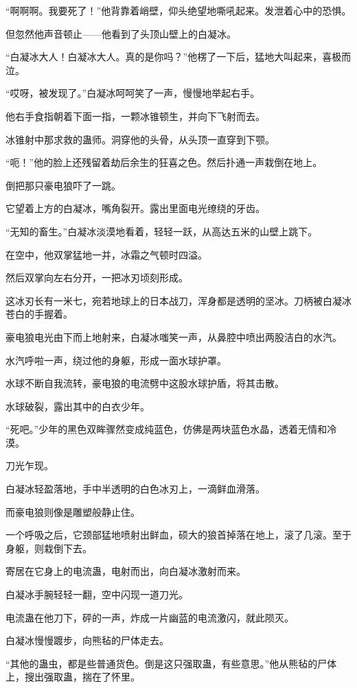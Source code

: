 \begin{this_body}
“啊啊啊。我要死了！”他背靠着峭壁，仰头绝望地嘶吼起来。发泄着心中的恐惧。

但忽然他声音顿止——他看到了头顶山壁上的白凝冰。

“白凝冰大人！白凝冰大人。真的是你吗？”他楞了一下后，猛地大叫起来，喜极而泣。

“哎呀，被发现了。”白凝冰呵呵笑了一声，慢慢地举起右手。

他右手食指朝着下面一指，一颗冰锥顿生，并向下飞射而去。

冰锥射中那求救的蛊师。洞穿他的头骨，从头顶一直穿到下颚。

“呃！”他的脸上还残留着劫后余生的狂喜之色。然后扑通一声栽倒在地上。

倒把那只豪电狼吓了一跳。

它望着上方的白凝冰，嘴角裂开。露出里面电光缭绕的牙齿。

“无知的畜生。”白凝冰淡漠地看着，轻轻一跃，从高达五米的山壁上跳下。

在空中，他双掌猛地一并，冰霜之气顿时四溢。

然后双掌向左右分开，一把冰刃顷刻形成。

这冰刃长有一米七，宛若地球上的日本战刀，浑身都是透明的坚冰。刀柄被白凝冰苍白的手握着。

豪电狼电光由下而上地射来，白凝冰嗤笑一声，从鼻腔中喷出两股洁白的水汽。

水汽呼啦一声，绕过他的身躯，形成一面水球护罩。

水球不断自我流转，豪电狼的电流劈中这股水球护盾，将其击散。

水球破裂，露出其中的白衣少年。

“死吧。”少年的黑色双眸骤然变成纯蓝色，仿佛是两块蓝色水晶，透着无情和冷漠。

刀光乍现。

白凝冰轻盈落地，手中半透明的白色冰刃上，一滴鲜血滑落。

而豪电狼则像是雕塑般静止住。

一个呼吸之后，它颈部猛地喷射出鲜血，硕大的狼首掉落在地上，滚了几滚。至于身躯，则栽倒下去。

寄居在它身上的电流蛊，电射而出，向白凝冰激射而来。

白凝冰手腕轻轻一翻，空中闪现一道刀光。

电流蛊在他刀下，砰的一声，炸成一片幽蓝的电流激闪，就此陨灭。

白凝冰慢慢踱步，向熊毡的尸体走去。

“其他的蛊虫，都是些普通货色。倒是这只强取蛊，有些意思。”他从熊毡的尸体上，搜出强取蛊，揣在了怀里。


\end{this_body}
